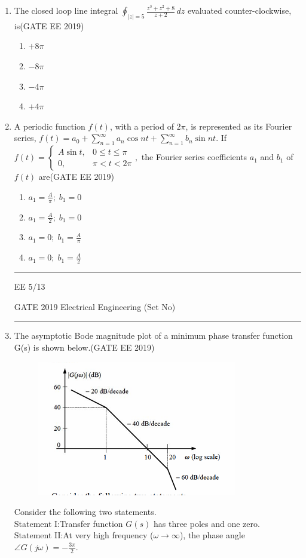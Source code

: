 \documentclass[a4paper,10pt]{exam}
\theoremstyle{remark}
\begin{document}
\begin{enumerate}
\begin{enumerate}[label=\arabic*.]
\item The closed loop line integral
$
\oint_{|z|=5} \frac{z^3 + z^2 + 8}{z+2}\, dz
$
evaluated counter-clockwise, is\hfill{(GATE EE 2019)}

\begin{multicols}{4}
\begin{enumerate}
\item $+8\pi$
\item $-8\pi$
\item $-4\pi$
\item $+4\pi$
\end{enumerate}
\end{multicols}

\item A periodic function $f(t)$, with a period of $2\pi$, is represented as its Fourier series,
$
f(t) = a_0 + \sum_{n=1}^{\infty} a_n \cos nt + \sum_{n=1}^{\infty} b_n \sin nt.
$
If
$
f(t) = \begin{cases}
A \sin t, & 0 \leq t \leq \pi \\
0, & \pi < t < 2\pi
\end{cases},
$
the Fourier series coefficients $a_1$ and $b_1$ of $f(t)$ are\hfill{(GATE EE 2019)}

\begin{multicols}{2}
\begin{enumerate}
    \item $a_1 = \frac{A}{\pi};\; b_1 = 0$
    \item $a_1 = \frac{A}{2};\; b_1 = 0$
    \item $a_1 = 0;\; b_1 = \frac{A}{\pi}$
    \item $a_1 = 0;\; b_1 = \frac{A}{2}$
\end{enumerate}
\end{multicols}
\vfill
\noindent\rule{\linewidth}{0.4pt}
EE \hfill 5/13
\newpage
\raggedright{GATE 2019 Electrical Engineering (Set No)}
\noindent\rule{\linewidth}{0.4pt}
\item The asymptotic Bode magnitude plot of a minimum phase transfer function G(s) is shown below.\hfill{(GATE EE 2019)}
\begin{figure}[H]
    \centering
    \includegraphics[width=0.5\columnwidth]{figs/Q 29.png}
    \caption{}
    \label{fig:placeholder}
\end{figure}
Consider the following two statements.\\
Statement I:Transfer function $G(s)$ has three poles and one zero.\\
Statement II:At very high frequency ($ \omega \to \infty $), the phase angle $ \angle G(j\omega) = -\frac{3\pi}{2} $.


\end{enumerate}
\end{enumerate}
\end{document}
